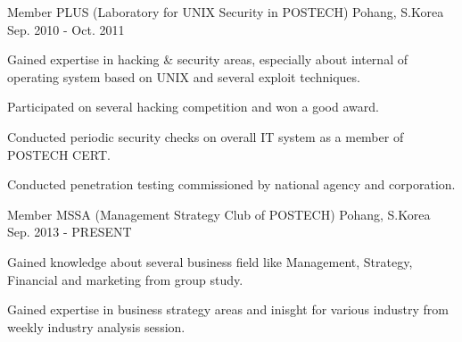 \begin{cventries}
  \cventry
  {Member} %
  {PLUS (Laboratory for UNIX Security in POSTECH)} %
  {Pohang, S.Korea} %
  {Sep. 2010 - Oct. 2011} %
  {
    \begin{cvitems} %
    \item {Gained expertise in hacking \& security areas, especially about internal of operating system based on UNIX and several exploit techniques.}
    \item {Participated on several hacking competition and won a good award.}
    \item {Conducted periodic security checks on overall IT system as a member of POSTECH CERT.}
    \item {Conducted penetration testing commissioned by national agency and corporation.}
    \end{cvitems}
  }

  \cventry
  {Member} %
  {MSSA (Management Strategy Club of POSTECH)} %
  {Pohang, S.Korea} %
  {Sep. 2013 - PRESENT} %
  {
    \begin{cvitems} %
    \item {Gained knowledge about several business field like Management, Strategy, Financial and marketing from group study.}
    \item {Gained expertise in business strategy areas and inisght for various industry from weekly industry analysis session.}
    \end{cvitems}
  }

\end{cventries}
